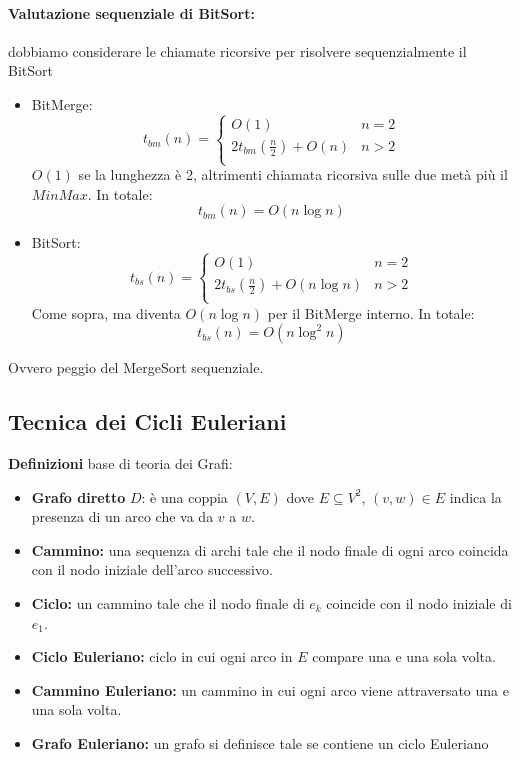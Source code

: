 \documentclass[11pt]{article}
\begin{document}
	\paragraph{Valutazione sequenziale di BitSort:} dobbiamo considerare le chiamate ricorsive per risolvere sequenzialmente il BitSort
	\begin{itemize}
		\item BitMerge: 
		$$ t_{bm} (n) = \begin{cases}
			O(1) & n = 2 \\
			2 t_{bm} \left(\frac{n}{2}\right) + O(n) & n > 2 \\
		\end{cases}
		$$
		$O(1)$ se la lunghezza è 2, altrimenti chiamata ricorsiva sulle due metà più il $MinMax$. In totale:
		$$ t_{bm} (n) = O(n \log n) $$
		
		\item BitSort: 
		$$ t_{bs} (n)  = \begin{cases}
			O(1) & n = 2 \\
			2 t_{bs} \left(\frac{n}{2}\right) + O(n \log n) & n > 2 \\
		\end{cases}
		$$
		Come sopra, ma diventa $O(n \log n)$ per il BitMerge interno. In totale: 
		$$ t_{bs} (n) = O (n \log^2 n) $$
	\end{itemize}
	Ovvero peggio del MergeSort sequenziale. \\
	
	\newpage
	
	
	\subsection{Tecnica dei Cicli Euleriani}
	
	\textbf{Definizioni} base di teoria dei Grafi: 
	\begin{itemize}
		\item \textbf{Grafo diretto} $D$: è una coppia $(V,E)$ dove $E \subseteq V^2$, $(v,w) \in E$ indica la presenza di un arco che va da $v$ a $w$.\\
		
		\item \textbf{Cammino:} una sequenza di archi tale che il nodo finale di ogni arco coincida con il nodo iniziale dell'arco successivo.\\
		
		\item \textbf{Ciclo:} un cammino tale che il nodo finale di $e_k$ coincide con il nodo iniziale di $e_1$.\\
		
		\item \textbf{Ciclo Euleriano:} ciclo in cui ogni arco in $E$ compare una e una sola volta.\\
		
		\item \textbf{Cammino Euleriano:} un cammino in cui ogni arco viene attraversato una e una sola volta.\\
		
		\item \textbf{Grafo Euleriano:} un grafo si definisce tale se contiene un ciclo Euleriano
	\end{itemize}
	
\end{document}
